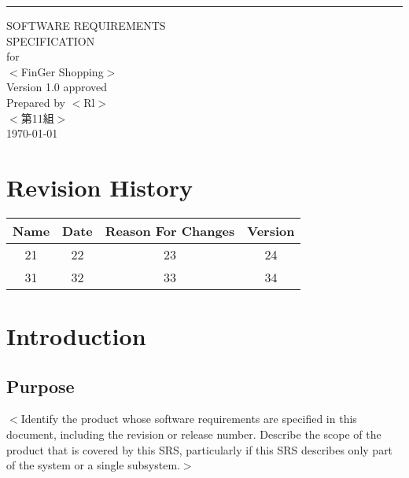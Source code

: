 \documentclass{scrreprt}
\date{}
\def\myversion{1.0 }
\begin{document}
\begin{CJK}{UTF8}{bkai}
\begin{flushright}
    \rule{16cm}{5pt}\vskip1cm
    \begin{bfseries}
        \Huge{SOFTWARE REQUIREMENTS\\ SPECIFICATION}\\
        \vspace{1.9cm}
        for\\
        \vspace{1.9cm}
        $<$FinGer Shopping$>$\\
        \vspace{1.9cm}
        \LARGE{Version \myversion approved}\\
        \vspace{1.9cm}
        Prepared by $<$Rl$>$\\
        \vspace{1.9cm}
        $<$第11組$>$\\
        \vspace{1.9cm}
        \today\\
    \end{bfseries}
\end{flushright}

\tableofcontents


\chapter*{Revision History}

\begin{center}
    \begin{tabular}{|c|c|c|c|}
        \hline
	    Name & Date & Reason For Changes & Version\\
        \hline
	    21 & 22 & 23 & 24\\
        \hline
	    31 & 32 & 33 & 34\\
        \hline
    \end{tabular}
\end{center}

\chapter{Introduction}

\section{Purpose}
$<$Identify the product whose software requirements are specified in this 
document, including the revision or release number. Describe the scope of the 
product that is covered by this SRS, particularly if this SRS describes only 
part of the system or a single subsystem.$>$


\end{CJK}
\end{document}
